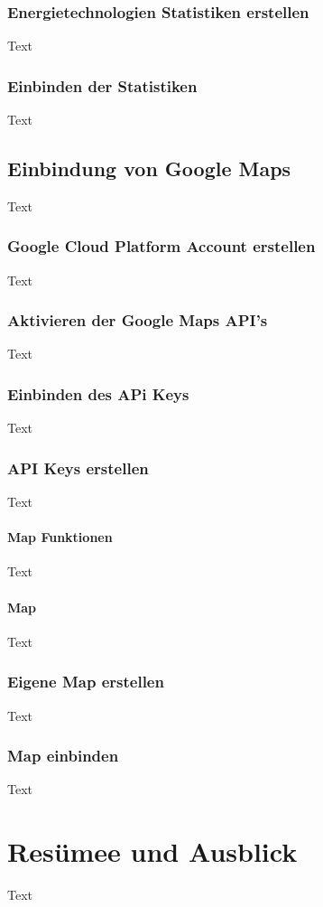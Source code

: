 \subsection{Energietechnologien Statistiken erstellen}
Text
\subsection{Einbinden der Statistiken}
Text

\section{Einbindung von Google Maps}
Text
\subsection{Google Cloud Platform Account erstellen}
Text
\subsection{Aktivieren der Google Maps API’s}
Text
\subsection{Einbinden des APi Keys}
Text
\subsection{API Keys erstellen}
Text
\subsubsection{Map Funktionen}
Text
\subsubsection{Map}
Text
\subsection{Eigene Map erstellen}
Text
\subsection{Map einbinden}
Text





\chapter{Resümee und Ausblick}
Text

